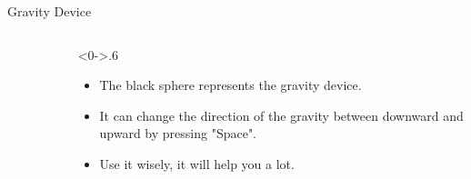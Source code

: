 \documentclass[notheorems]{beamer}
\begin{document}
\begin{framenl}{Gravity Device}
\begin{columns}[T]
\begin{column}
\begin{figure}[thpb]
\end{figure}
\end{column}%
\hfill%
\begin{column}<0->{.6\textwidth}
\begin{itemize}
\item<1-> The black sphere represents the gravity device.
\item<2-> It can change the direction of the gravity between downward and upward by pressing "Space".
\item<3-> Use it wisely, it will help you a lot.
\end{itemize}
\end{column}%
\end{columns}
\end{framenl}
\end{document}
